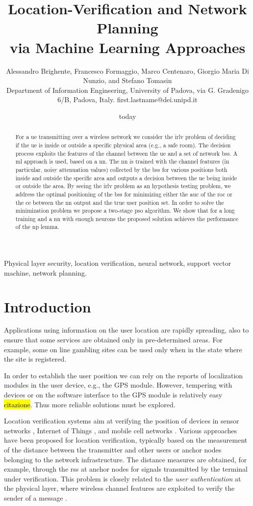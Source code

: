 \documentclass[conference,draftcls,onecolumn]{IEEEtran}
\title{Location-Verification and Network Planning \\ via Machine Learning Approaches}
\author{Alessandro Brighente, Francesco Formaggio, Marco Centenaro, Giorgio Maria Di Nunzio, and    Stefano Tomasin \\ {\small Department of Information Engineering, University of Padova, via G. Gradenigo 6/B, Padova, Italy. first.lastname@dei.unipd.it} }
\date{today}
\begin{document}
\maketitle

\begin{abstract}
For a \ac{ue} transmitting over a wireless network we consider the \ac{irlv} problem of deciding if the \ac{ue} is inside or outside a specific physical area (e.g., a safe room). The decision process exploits the features of the channel between the \ac{ue} and a set of network \acp{bs}. A  \ac{ml} approach is used, based on a \ac{nn}. The \ac{nn} is trained with the channel features (in particular, noisy attenuation values) collected by the \acp{bs} for various positions both inside and outside the specific area and outputs a decision between the \ac{ue} being inside or outside the area. By seeing the \ac{irlv} problem as an hypothesis testing problem, we address the optimal positioning of the \acp{bs} for minimizing either the \ac{auc} of the \ac{roc} or  the \ac{ce} between the \ac{nn} output and the true user position set. In order to solve the minimization problem we propose a two-stage \ac{pso} algorithm. We show that for a long training and a \ac{nn} with enough neurons the proposed solution achieves the performance of the \ac{np} lemma.
\end{abstract}

\begin{IEEEkeywords}
Physical layer security, location verification, neural network, support vector machine, network planning.
\end{IEEEkeywords}
\glsresetall

\section{Introduction}

Applications using information on the user location are rapidly spreading, also to ensure that some services are obtained only in pre-determined areas. For example, some on line gambling sites can be used only when in the state where the site is registered.

In order to establish the user position we can rely on the reports of localization modules in the user device, e.g., the GPS module. However, tempering with devices or on the software interface to the GPS module is relatively easy \hl{citazione}. Thus more reliable solutions must be explored.

Location verification systems aim at verifying the position of devices in sensor networks \cite{Zeng-survey, 8376254}, Internet of Things \cite{7903611}, and mobile cell networks \cite{quaglia}. Various approaches have been proposed for location verification, typically based on the measurement of the distance between the transmitter and other users  or  anchor nodes belonging to the network infrastructure. The distance measures are obtained, for example, through the \ac{rss} at anchor nodes for signals transmitted by the terminal under verification.  This problem is closely related to the {\em user authentication} at the physical layer, where wireless channel features are exploited to verify the sender of a message \cite{7270404}.
\end{document}

